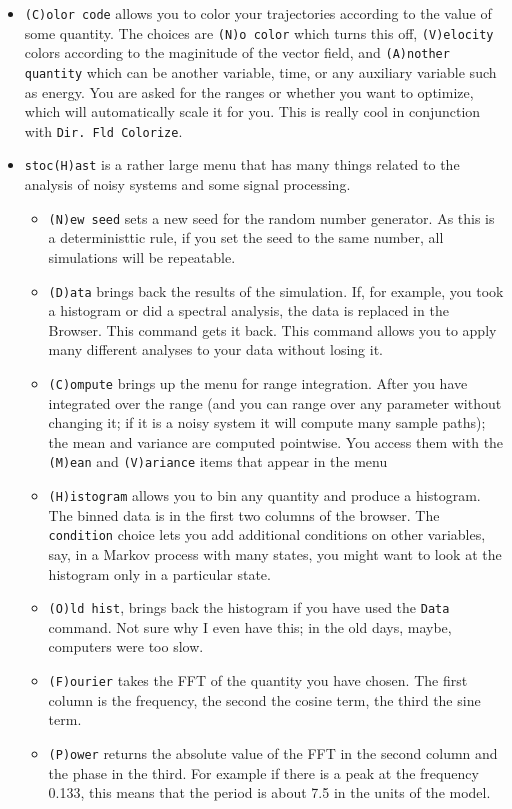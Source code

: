 \documentclass{article}
\begin{document}
\begin{itemize}
\item {\tt (C)olor code} allows you to color your trajectories according to the value of some quantity. The choices are {\tt (N)o color} which turns this off, {\tt (V)elocity} colors according to the maginitude of the vector field, and {\tt (A)nother quantity} which can be another variable, time, or any auxiliary variable such as energy. You are asked for the ranges or whether you want to optimize, which will automatically scale it for you. This is really cool in conjunction with {\tt Dir. Fld Colorize}.
\item {\tt stoc(H)ast} is a rather large menu that has many things related to the analysis of noisy systems and some signal processing.
\begin{itemize}
\item {\tt (N)ew seed} sets a new seed for the random number generator. As this is a deterministtic rule, if you set the seed to the same number, all simulations will be repeatable.
\item {\tt (D)ata} brings back the results of the simulation. If, for example, you took a histogram or did a spectral analysis, the data is replaced in the Browser. This command gets it back. This command allows you to apply many different analyses to your data without losing it.
\item {\tt (C)ompute} brings up the menu for range integration. After you have integrated over the range (and you can range over any parameter without changing it; if it is a noisy system it will compute many sample paths); the mean and variance are computed pointwise. You access them with the {\tt (M)ean} and {\tt (V)ariance} items that appear in the menu
\item {\tt (H)istogram} allows you to bin any quantity and produce a histogram. The binned data is in the first two columns of the browser. The {\tt condition} choice lets you add additional conditions on other variables, say, in a Markov process with many states, you might want to look at the histogram only in a particular state. 
\item {\tt (O)ld hist}, brings back the histogram if you have used the {\tt Data} command. Not sure why I even have this; in the old days, maybe, computers were too slow.
\item {\tt (F)ourier} takes the FFT of the quantity you have chosen. The first column is the frequency, the second the cosine term, the third the sine term.  
\item {\tt (P)ower} returns the absolute value of the FFT in the second column and the phase in the third. For example if there is a peak at the frequency 0.133, this means that the period is about 7.5 in the units of the model.

\end{itemize}
\end{itemize}
\end{document}
